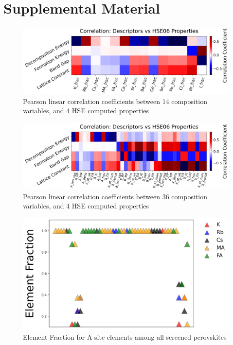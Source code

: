 \documentclass[twoside, twocolumn, 9pt, draft]{article}
\begin{document}



\section*{Supplemental Material}
\label{sec:orgd818b29}
\printglossaries

\begin{figure}
\centering
\includegraphics[width=.9\linewidth]{./expval/HSE_v_comp_pearson2.png}
\caption{\label{fig:pearson_hcomp} Pearson linear correlation coefficients between 14 composition variables, and 4 HSE computed properties}
\end{figure}

\begin{figure}
\centering
\includegraphics[width=.9\linewidth]{./expval/HSE_v_site_prop_pearson.png}
\caption{\label{fig:pearson_hsite} Pearson linear correlation coefficients between 36 composition variables, and 4 HSE computed properties}
\end{figure}

\begin{figure}
\centering
\includegraphics[width=.9\linewidth]{./expval/Element_AFrac.jpg}
\caption{\label{fig:sreened_frac_A} Element Fraction for A site elements among all screened perovskites}
\end{figure}
\end{document}
